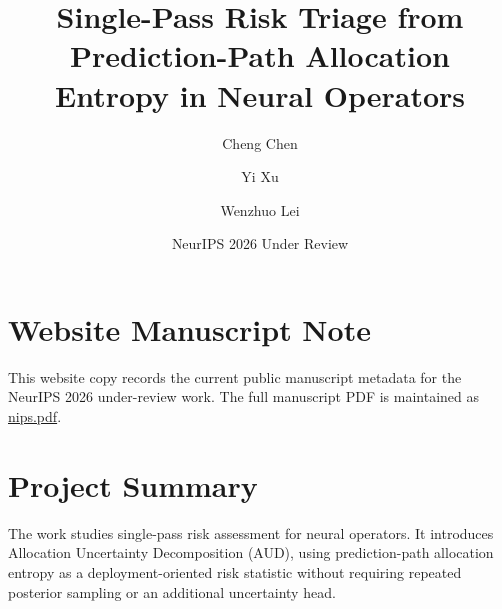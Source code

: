 \documentclass{article}
\title{Single-Pass Risk Triage from Prediction-Path Allocation Entropy in Neural Operators}
\author{Cheng Chen \and Yi Xu \and Wenzhuo Lei}
\date{NeurIPS 2026 Under Review}
\begin{document}
\maketitle

\section*{Website Manuscript Note}

This website copy records the current public manuscript metadata for the NeurIPS 2026 under-review work. The full manuscript PDF is maintained as \href{nips.pdf}{nips.pdf}.

\section*{Project Summary}

The work studies single-pass risk assessment for neural operators. It introduces Allocation Uncertainty Decomposition (AUD), using prediction-path allocation entropy as a deployment-oriented risk statistic without requiring repeated posterior sampling or an additional uncertainty head.
\end{document}
